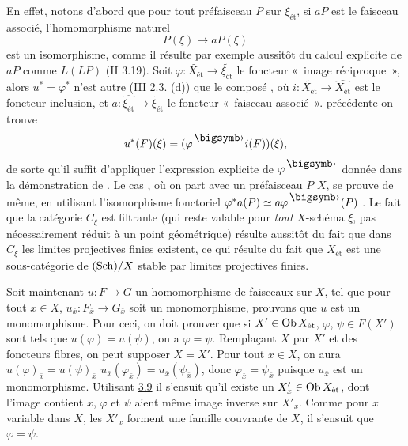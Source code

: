 \documentclass[10pt]{../fichiers-configuration-latex/smfart}
\begin{document}
En effet, notons d'abord que pour tout préfaisceau $P$ sur
$\xi_{\text{ét}}$,
si $aP$ est le faisceau associé, l'homomorphisme naturel
$$
P(\xi) \to aP(\xi)
$$
est un isomorphisme, comme il résulte par exemple aussitôt du
calcul explicite de\pageoriginale  $aP$ comme $L(LP)$ (II 3.19). Soit
$\varphi :
\widetilde{X_{\text{ét}}} \to \widetilde{\xi_{\text{ét}}}$ le foncteur « image réciproque », alors $u^{\ast} = \varphi^{\ast}$ n'est autre
(III 2.3. (d)) que le composé , où $i :
\widetilde{X_{\text{ét}}} \to \widehat{X_{\text{ét}}}$
est le foncteur inclusion, et $a :
\widehat{\xi_{\text{ét}}} \to
\widetilde{\xi_{\text{ét}}}$ le foncteur « faisceau
associé ».  précédente on trouve
$$
u^{\ast} (F) (\xi) = (\varphi^{\bigdot} i(F)) (\xi){\quoi},
$$
de sorte qu'il suffit d'appliquer l'expression explicite de
$\varphi^{\bigdot}$ donnée dans la démonstration de . %
Le cas , où on part avec un préfaisceau $P$  $X$, se prouve de même, en
utilisant l'isomorphisme fonctoriel $\varphi^{\ast} a(P) \simeq a
\varphi^{\bigdot} (P)$ . %
Le fait que la catégorie $C_{\xi}$ est filtrante (qui reste valable pour \emph{tout} $X$-schéma $\xi$, pas
nécessairement réduit à un point géométrique)
résulte aussitôt du
fait que dans $C_{\xi}$ les limites projectives finies existent, ce
qui résulte du fait que $X_{\text{ét}}$ est une sous-catégorie de
$(\operatorname{Sch}) /X$ stable par limites projectives finies.

Soit maintenant $u : F \to G$ un homomorphisme de faisceaux sur $X$,
tel que pour tout $x \in X$, $u_{\bar{x}} : F_{\bar{x}} \to
G_{\bar{x}}$ soit un monomorphisme, prouvons que $u$ est un
monomorphisme. Pour ceci, on doit prouver que si $X'\in \operatorname{Ob}
X_{\text{ét}}$, $\varphi$, $\psi \in F(X')$ sont tels que $u
(\varphi) = u (\psi)$, on a $\varphi = \psi$. Remplaçant $X$ par
$X'$ et  des foncteurs fibres, on peut
supposer $X = X'$. Pour tout $x \in X$, on aura $u
(\varphi)_{\bar{x}} = u (\psi)_{\bar{x}}$ \ie $u_{\bar{x}}
(\varphi_{\bar{x}}) = u_{\bar{x}} (\psi_{\bar{x}})$, donc
$\varphi_{\bar{x}} = \psi_{\bar{x}}$ puisque $u_{\bar{x}}$ est un
monomorphisme. Utilisant \hyperref[VIII.prop3.9]{3.9} %
il s'ensuit qu'il existe un $X'_x \in \operatorname{Ob} X_{\text{ét}}$, dont l'image contient $x$, 
 $\varphi$ et $\psi$ aient même image inverse sur $X'_x$. Comme pour
$x$ variable dans $X$, les $X'_x$ forment une famille couvrante de
$X$, il s'ensuit que $\varphi = \psi$.
\end{document}
